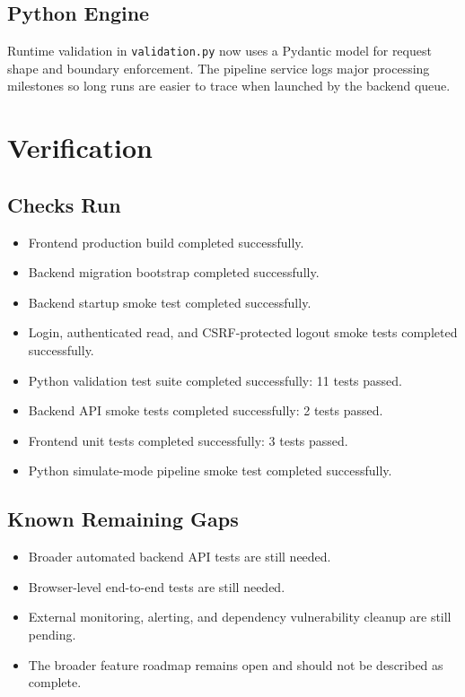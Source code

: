 \documentclass[12pt,a4paper]{report}
\begin{document}
\section{Python Engine}

Runtime validation in \texttt{validation.py} now uses a Pydantic model for request shape and boundary enforcement. The pipeline service logs major processing milestones so long runs are easier to trace when launched by the backend queue.

\chapter{Verification}

\section{Checks Run}

\begin{itemize}
  \item Frontend production build completed successfully.
  \item Backend migration bootstrap completed successfully.
  \item Backend startup smoke test completed successfully.
  \item Login, authenticated read, and CSRF-protected logout smoke tests completed successfully.
  \item Python validation test suite completed successfully: 11 tests passed.
  \item Backend API smoke tests completed successfully: 2 tests passed.
  \item Frontend unit tests completed successfully: 3 tests passed.
  \item Python simulate-mode pipeline smoke test completed successfully.
\end{itemize}

\section{Known Remaining Gaps}

\begin{itemize}
  \item Broader automated backend API tests are still needed.
  \item Browser-level end-to-end tests are still needed.
  \item External monitoring, alerting, and dependency vulnerability cleanup are still pending.
  \item The broader feature roadmap remains open and should not be described as complete.
\end{itemize}
\end{document}
